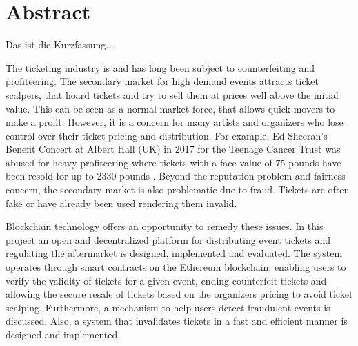 \chapter*{Abstract}


Das ist die Kurzfassung...




The ticketing industry is and has long been subject to counterfeiting and profiteering. The secondary market for high demand events attracts ticket scalpers, that hoard tickets and try to sell them at prices well above the initial value. This can be seen as a normal market force, that allows quick movers to make a profit. However, it is a concern for many artists and organizers who lose control over their ticket pricing and distribution. For example, Ed Sheeran's Benefit Concert at Albert Hall (UK) in 2017 for the Teenage Cancer Trust was abused for heavy profiteering where tickets with a face value of 75 pounds have been resold for up to 2330 pounds \cite{ed-sheeran-concert-ticket-prices}. Beyond the reputation problem and fairness concern, the secondary market is also problematic due to fraud. Tickets are often fake or have already been used rendering them invalid. 

Blockchain technology offers an opportunity to remedy these issues. In this project an open and decentralized platform for distributing event tickets and regulating the aftermarket is designed, implemented and evaluated. The system operates through smart contracts on the Ethereum blockchain, enabling users to verify the validity of tickets for a given event, ending counterfeit tickets and allowing the secure resale of tickets based on the organizers pricing to avoid ticket scalping. Furthermore, a mechanism to help users detect fraudulent events is discussed. Also, a system that invalidates tickets in a fast and efficient manner is designed and implemented.